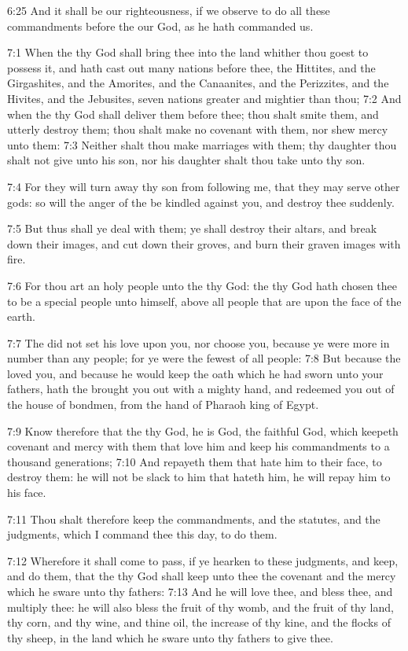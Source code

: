 6:25 And it shall be our righteousness, if we observe to do all these
commandments before the \LORD our God, as he hath commanded us.

7:1 When the \LORD thy God shall bring thee into the land whither thou
goest to possess it, and hath cast out many nations before thee, the
Hittites, and the Girgashites, and the Amorites, and the Canaanites,
and the Perizzites, and the Hivites, and the Jebusites, seven nations
greater and mightier than thou; 7:2 And when the \LORD thy God shall
deliver them before thee; thou shalt smite them, and utterly destroy
them; thou shalt make no covenant with them, nor shew mercy unto them:
7:3 Neither shalt thou make marriages with them; thy daughter thou
shalt not give unto his son, nor his daughter shalt thou take unto thy
son.

7:4 For they will turn away thy son from following me, that they may
serve other gods: so will the anger of the \LORD be kindled against
you, and destroy thee suddenly.

7:5 But thus shall ye deal with them; ye shall destroy their altars,
and break down their images, and cut down their groves, and burn their
graven images with fire.

7:6 For thou art an holy people unto the \LORD thy God: the \LORD thy
God hath chosen thee to be a special people unto himself, above all
people that are upon the face of the earth.

7:7 The \LORD did not set his love upon you, nor choose you, because ye
were more in number than any people; for ye were the fewest of all
people: 7:8 But because the \LORD loved you, and because he would keep
the oath which he had sworn unto your fathers, hath the \LORD brought
you out with a mighty hand, and redeemed you out of the house of
bondmen, from the hand of Pharaoh king of Egypt.

7:9 Know therefore that the \LORD thy God, he is God, the faithful God,
which keepeth covenant and mercy with them that love him and keep his
commandments to a thousand generations; 7:10 And repayeth them that
hate him to their face, to destroy them: he will not be slack to him
that hateth him, he will repay him to his face.

7:11 Thou shalt therefore keep the commandments, and the statutes, and
the judgments, which I command thee this day, to do them.

7:12 Wherefore it shall come to pass, if ye hearken to these
judgments, and keep, and do them, that the \LORD thy God shall keep
unto thee the covenant and the mercy which he sware unto thy fathers:
7:13 And he will love thee, and bless thee, and multiply thee: he will
also bless the fruit of thy womb, and the fruit of thy land, thy corn,
and thy wine, and thine oil, the increase of thy kine, and the flocks
of thy sheep, in the land which he sware unto thy fathers to give
thee.

